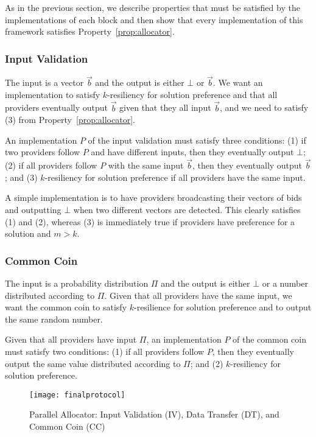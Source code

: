 As in the previous section, we describe properties that must be satisfied
by the implementations of each block and then show that every implementation
of this framework satisfies Property~\ref{prop:allocator}.

\subsubsection*{Input Validation}
The input is a vector $\vec{b}$ and the output is either
$\bot$ or $\vec{b}$. We want an implementation to satisfy 
$k$-resiliency for solution preference and that all providers 
eventually output $\vec{b}$ given that they all input $\vec{b}$,
and we need to satisfy (3) from Property~\ref{prop:allocator}.

\begin{property}
\label{prop:iv}
An implementation $P$ of the input validation must satisfy three conditions:
(1) if two providers follow $P$ and have different inputs, then they eventually output $\bot$;
(2) if all providers follow $P$ with the same input $\vec{b}$, then they eventually output $\vec{b}$;
and (3) $k$-resiliency for solution preference if all providers have the same input.
\end{property}

A simple implementation is to have providers broadcasting their vectors of bids
and outputting $\bot$ when two different vectors are detected.
This clearly satisfies (1) and (2),
whereas (3) is immediately true if providers have preference for a solution and $m > k$.

\subsubsection*{Common Coin}
The input is a probability distribution $\Pi$
and the output is either $\bot$ or a number distributed according to $\Pi$.
Given that all providers have the same input, we 
want the common coin to satisfy $k$-resilience for solution preference 
and to output the same random number.

\begin{property}
\label{prop:common-coin}
Given that all providers have input $\Pi$,
an implementation $P$ of the common coin must satisfy two conditions:
(1) if all providers follow $P$, then they eventually output 
the same value distributed according to $\Pi$;
and (2) $k$-resiliency for solution preference.
\end{property}

\begin{figure}[tbp]
	\centering
	\texttt{[image: finalprotocol]}
	\caption{Parallel Allocator: Input Validation (IV), Data Transfer (DT), and Common Coin (CC)}
	\label{fig:parallel-allocator}
\end{figure}

